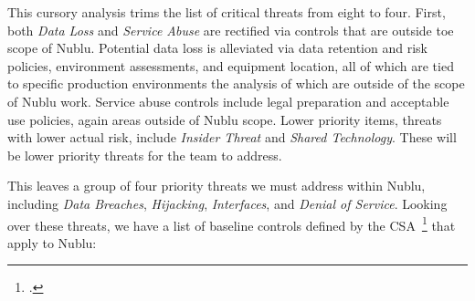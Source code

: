 \documentclass[10pt,letterpaper]{article}
\begin{document}
This cursory analysis trims the list of critical threats from eight to four.  First, both {\sl Data Loss} and {\sl Service Abuse} are rectified via controls that are outside toe scope of Nublu.  Potential data loss is alleviated via data retention and risk policies, environment assessments, and equipment location, all of which are tied to specific production environments the analysis of which are outside of the scope of Nublu work.  Service abuse controls include legal preparation and acceptable use policies, again areas outside of Nublu scope.  Lower priority items, threats with lower actual risk, include {\sl Insider Threat} and {\sl Shared Technology}.  These will be lower priority threats for the team to address.

This leaves a group of four priority threats we must address within Nublu, including {\sl Data Breaches}, {\sl Hijacking}, {\sl Interfaces}, and {\sl Denial of Service}.  Looking over these threats, we have a list of baseline controls defined by the CSA~\footcite{csa-ccmv3:13} that apply to Nublu:
\end{document}

